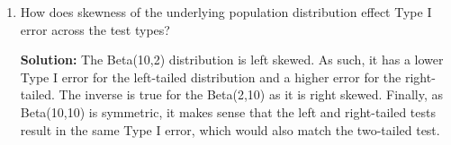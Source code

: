 \documentclass{article}\usepackage[]{graphicx}\usepackage[]{xcolor}
\begin{document}
\begin{enumerate}
\begin{enumerate}
    \item How does skewness of the underlying population distribution effect
    Type I error across the test types?
    
    \textbf{Solution:} The Beta(10,2) distribution is left skewed. As such, it has a lower Type I error for the left-tailed distribution and a higher error for the right-tailed.  The inverse is true for the Beta(2,10) as it is right skewed. Finally, as Beta(10,10) is symmetric, it makes sense that the left and right-tailed tests result in the same Type I error, which would also match the two-tailed test.
  \end{enumerate}
\end{enumerate}

\end{document}
